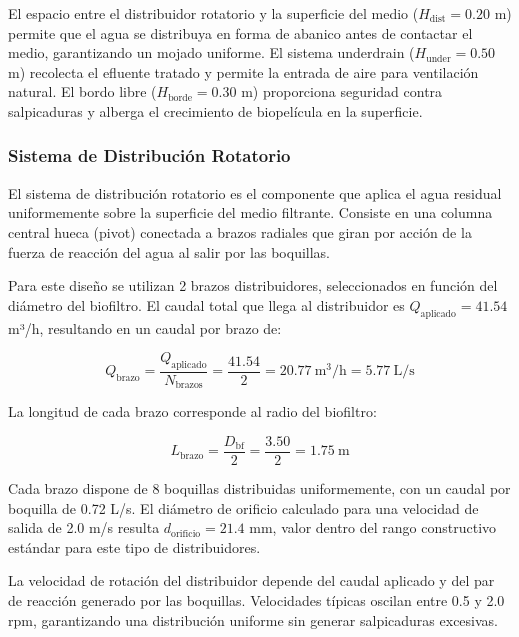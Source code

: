 \documentclass[12pt,a4paper]{article}
\begin{document}
El espacio entre el distribuidor rotatorio y la superficie del medio ($H_{\text{dist}} = 0.20$ m) permite que el agua se distribuya en forma de abanico antes de contactar el medio, garantizando un mojado uniforme. El sistema underdrain ($H_{\text{under}} = 0.50$ m) recolecta el efluente tratado y permite la entrada de aire para ventilación natural. El bordo libre ($H_{\text{borde}} = 0.30$ m) proporciona seguridad contra salpicaduras y alberga el crecimiento de biopelícula en la superficie.

\subsubsection*{Sistema de Distribución Rotatorio}

El sistema de distribución rotatorio es el componente que aplica el agua residual uniformemente sobre la superficie del medio filtrante. Consiste en una columna central hueca (pivot) conectada a brazos radiales que giran por acción de la fuerza de reacción del agua al salir por las boquillas.

Para este diseño se utilizan 2 brazos distribuidores, seleccionados en función del diámetro del biofiltro. El caudal total que llega al distribuidor es $Q_{\text{aplicado}} = 41.54$ m³/h, resultando en un caudal por brazo de:

\begin{equation}
Q_{\text{brazo}} = \frac{Q_{\text{aplicado}}}{N_{\text{brazos}}} = \frac{41.54}{2} = 20.77\ \text{m}^3\text{/h} = 5.77\ \text{L/s}
\end{equation}

La longitud de cada brazo corresponde al radio del biofiltro:

\begin{equation}
L_{\text{brazo}} = \frac{D_{\text{bf}}}{2} = \frac{3.50}{2} = 1.75\ \text{m}
\end{equation}

Cada brazo dispone de 8 boquillas distribuidas uniformemente, con un caudal por boquilla de 0.72 L/s. El diámetro de orificio calculado para una velocidad de salida de 2.0 m/s resulta $d_{\text{orificio}} = 21.4$ mm, valor dentro del rango constructivo estándar para este tipo de distribuidores.

La velocidad de rotación del distribuidor depende del caudal aplicado y del par de reacción generado por las boquillas. Velocidades típicas oscilan entre 0.5 y 2.0 rpm, garantizando una distribución uniforme sin generar salpicaduras excesivas.
\end{document}
